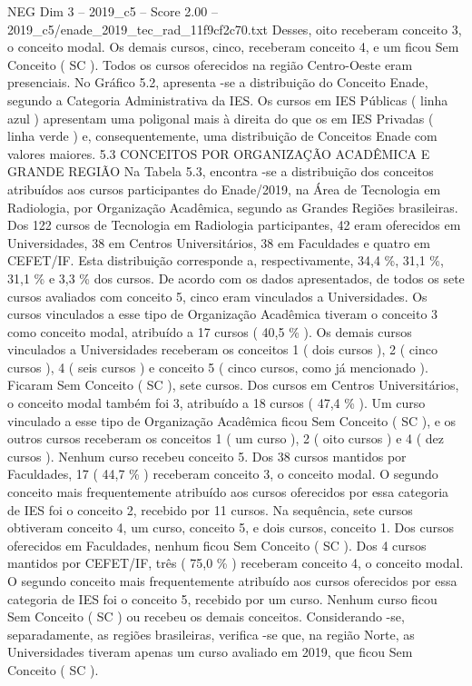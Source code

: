 \begin{textsample}{NEG Dim 3 – 2019\_c5 – Score 2.00 – 2019\_c5/enade\_2019\_tec\_rad\_11f9cf2c70.txt}
Desses, oito receberam conceito 3, o conceito modal.
Os demais cursos, cinco, receberam conceito 4, e um ficou Sem Conceito ( SC ).
Todos os cursos oferecidos na região Centro-Oeste eram presenciais.
No Gráfico 5.2, apresenta -se a distribuição do Conceito Enade, segundo a Categoria Administrativa da IES.
Os cursos em IES Públicas ( linha azul ) apresentam uma poligonal mais à direita do que os em IES Privadas ( linha verde ) e, consequentemente, uma distribuição de Conceitos Enade com valores maiores. 5.3 CONCEITOS POR ORGANIZAÇÃO ACADÊMICA E GRANDE REGIÃO Na Tabela 5.3, encontra -se a distribuição dos conceitos atribuídos aos cursos participantes do Enade/2019, na Área de Tecnologia em Radiologia, por Organização Acadêmica, segundo as Grandes Regiões brasileiras.
Dos 122 cursos de Tecnologia em Radiologia participantes, 42 eram oferecidos em Universidades, 38 em Centros Universitários, 38 em Faculdades e quatro em CEFET/IF.
Esta distribuição corresponde a, respectivamente, 34,4 \%, 31,1 \%, 31,1 \% e 3,3 \% dos cursos.
De acordo com os dados apresentados, de todos os sete cursos avaliados com conceito 5, cinco eram vinculados a Universidades.
Os cursos vinculados a esse tipo de Organização Acadêmica tiveram o conceito 3 como conceito modal, atribuído a 17 cursos ( 40,5 \% ).
Os demais cursos vinculados a Universidades receberam os conceitos 1 ( dois cursos ), 2 ( cinco cursos ), 4 ( seis cursos ) e conceito 5 ( cinco cursos, como já mencionado ).
Ficaram Sem Conceito ( SC ), sete cursos.
Dos cursos em Centros Universitários, o conceito modal também foi 3, atribuído a 18 cursos ( 47,4 \% ).
Um curso vinculado a esse tipo de Organização Acadêmica ficou Sem Conceito ( SC ), e os outros cursos receberam os conceitos 1 ( um curso ), 2 ( oito cursos ) e 4 ( dez cursos ).
Nenhum curso recebeu conceito 5.
Dos 38 cursos mantidos por Faculdades, 17 ( 44,7 \% ) receberam conceito 3, o conceito modal.
O segundo conceito mais frequentemente atribuído aos cursos oferecidos por essa categoria de IES foi o conceito 2, recebido por 11 cursos.
Na sequência, sete cursos obtiveram conceito 4, um curso, conceito 5, e dois cursos, conceito 1.
Dos cursos oferecidos em Faculdades, nenhum ficou Sem Conceito ( SC ).
Dos 4 cursos mantidos por CEFET/IF, três ( 75,0 \% ) receberam conceito 4, o conceito modal.
O segundo conceito mais frequentemente atribuído aos cursos oferecidos por essa categoria de IES foi o conceito 5, recebido por um curso.
Nenhum curso ficou Sem Conceito ( SC ) ou recebeu os demais conceitos.
Considerando -se, separadamente, as regiões brasileiras, verifica -se que, na região Norte, as Universidades tiveram apenas um curso avaliado em 2019, que ficou Sem Conceito ( SC ).

\end{textsample}
